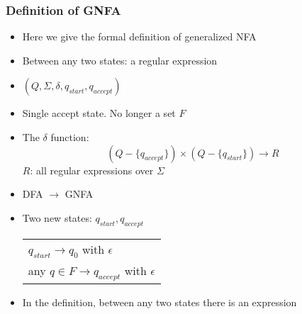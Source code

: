 




\begin{frame}[allowframebreaks] \frametitle{Definition of GNFA}
  \begin{itemize}
  \item Here we give the formal definition of generalized NFA
\item Between any two states: a regular expression
\item $(Q, \Sigma, \delta, q_{start}, q_{accept})$
\item Single accept state. No longer a set $F$
\item The $\delta$ function:
  \begin{equation*}
    (Q-\{q_{accept}\})\times
(Q-\{q_{start}\})\rightarrow R
  \end{equation*}
$R$: all regular expressions over $\Sigma$



\item DFA $\rightarrow $ GNFA

\item [] Two new states: $q_{start}, q_{accept}$

  \begin{center}
    \begin{tabular}{l}
$q_{start} \rightarrow q_0$ with $\epsilon$ \\
any $q \in F \rightarrow q_{accept}$ with $\epsilon$
    \end{tabular}
\end{center}
\item In the definition, between any two states there is
  an expression


\end{itemize}
\end{frame}
